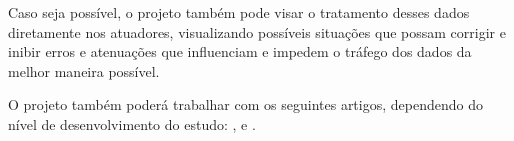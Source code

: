 \documentclass[conference]{IEEEtran}
\begin{document}
Caso seja poss\'ivel, o projeto tamb\'em pode visar o tratamento desses dados diretamente nos atuadores, visualizando poss\'iveis situa\c{c}\~oes que possam corrigir e inibir erros e atenua\c{c}\~oes que influenciam e impedem o tr\'afego dos dados da melhor maneira poss\'ivel.

O projeto tamb\'em poder\'a trabalhar com os seguintes artigos, dependendo do n\'ivel de desenvolvimento do estudo: \cite{performanceAnalysisNRF24L01}, \cite{efficientRFPowerTransfer} e \cite{selectionOpticalWavelengthDataTransmission}.













\def\refname{Refer\^encias}


%






\end{document}
